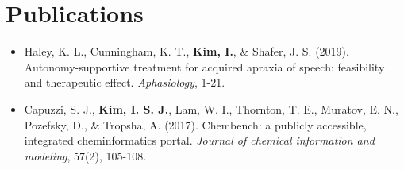 \documentclass[letterpaper,12pt]{article}
\newcommand{\resumeSubHeadingListStart}{\begin{itemize}[leftmargin=*]}
\newcommand{\resumeSubHeadingListEnd}{\end{itemize}}
\begin{document}

\section{Publications}
  \resumeSubHeadingListStart
    \item{Haley, K. L., Cunningham, K. T., \textbf{Kim, I.}, \& Shafer, J. S. (2019). Autonomy-supportive treatment for acquired apraxia of speech: feasibility and therapeutic effect. \textit{Aphasiology}, 1-21.}
    \item{Capuzzi, S. J., \textbf{Kim, I. S. J.}, Lam, W. I., Thornton, T. E., Muratov, E. N., Pozefsky, D., \& Tropsha, A. (2017). Chembench: a publicly accessible, integrated cheminformatics portal. \textit{Journal of chemical information and modeling}, 57(2), 105-108.}
  \resumeSubHeadingListEnd
\end{document}
